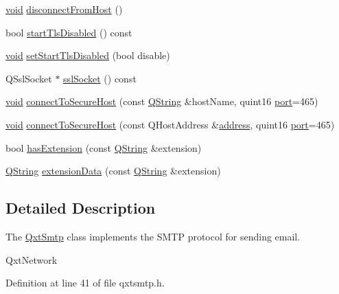 \begin{DoxyCompactItemize}
\hyperlink{group___u_a_v_objects_plugin_ga444cf2ff3f0ecbe028adce838d373f5c}{void} \hyperlink{class_qxt_smtp_a166c55a8572126db2d365c79feaff0b5}{disconnect\-From\-Host} ()
\item 
bool \hyperlink{class_qxt_smtp_a95aced8e46eda9fb17e37a458b183d66}{start\-Tls\-Disabled} () const 
\item 
\hyperlink{group___u_a_v_objects_plugin_ga444cf2ff3f0ecbe028adce838d373f5c}{void} \hyperlink{class_qxt_smtp_a0a5cce7cf9cc56fe72218c78838e3f7c}{set\-Start\-Tls\-Disabled} (bool disable)
\item 
Q\-Ssl\-Socket $\ast$ \hyperlink{class_qxt_smtp_a35808d932ed6d1d0dcce3db2e0bfbd1a}{ssl\-Socket} () const 
\item 
\hyperlink{group___u_a_v_objects_plugin_ga444cf2ff3f0ecbe028adce838d373f5c}{void} \hyperlink{class_qxt_smtp_a294201b061dcd6c3a8fc8d55a6a87d22}{connect\-To\-Secure\-Host} (const \hyperlink{group___u_a_v_objects_plugin_gab9d252f49c333c94a72f97ce3105a32d}{Q\-String} \&host\-Name, quint16 \hyperlink{classport}{port}=465)
\item 
\hyperlink{group___u_a_v_objects_plugin_ga444cf2ff3f0ecbe028adce838d373f5c}{void} \hyperlink{class_qxt_smtp_a7f5b9e89f0a0a94c975bfd69495fbc11}{connect\-To\-Secure\-Host} (const Q\-Host\-Address \&\hyperlink{glext_8h_a86e3d190561a4ae1e195e1a2bcc83db5}{address}, quint16 \hyperlink{classport}{port}=465)
\item 
bool \hyperlink{class_qxt_smtp_a390106b5c11c1df3094788b22b3e7e1c}{has\-Extension} (const \hyperlink{group___u_a_v_objects_plugin_gab9d252f49c333c94a72f97ce3105a32d}{Q\-String} \&extension)
\item 
\hyperlink{group___u_a_v_objects_plugin_gab9d252f49c333c94a72f97ce3105a32d}{Q\-String} \hyperlink{class_qxt_smtp_a6062f0845f66513d08ae4f11dcd7fdd6}{extension\-Data} (const \hyperlink{group___u_a_v_objects_plugin_gab9d252f49c333c94a72f97ce3105a32d}{Q\-String} \&extension)
\end{DoxyCompactItemize}


\subsection{Detailed Description}
The \hyperlink{class_qxt_smtp}{Qxt\-Smtp} class implements the S\-M\-T\-P protocol for sending email. 

Qxt\-Network 

Definition at line 41 of file qxtsmtp.\-h.



